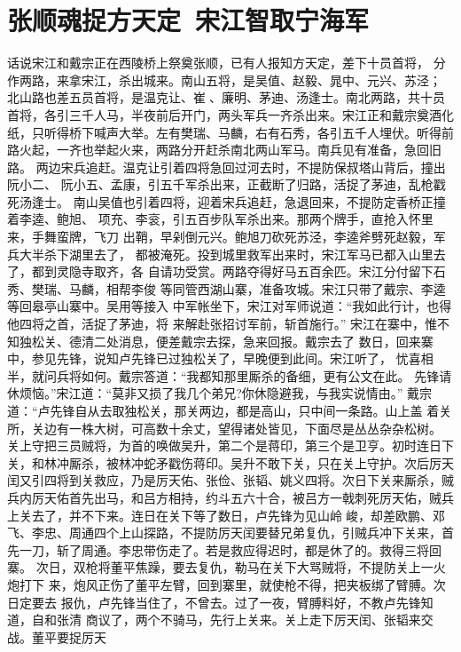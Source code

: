\chapter{张顺魂捉方天定~宋江智取宁海军}

话说宋江和戴宗正在西陵桥上祭奠张顺，已有人报知方天定，差下十员首将，
分作两路，来拿宋江，杀出城来。南山五将，是吴值、赵毅、晁中、元兴、苏泾；
北山路也差五员首将，是温克让、崔、廉明、茅迪、汤逢士。南北两路，共十员
首将，各引三千人马，半夜前后开门，两头军兵一齐杀出来。宋江正和戴宗奠酒化
纸，只听得桥下喊声大举。左有樊瑞、马麟，右有石秀，各引五千人埋伏。听得前
路火起，一齐也举起火来，两路分开赶杀南北两山军马。南兵见有准备，急回旧路。
两边宋兵追赶。温克让引着四将急回过河去时，不提防保叔塔山背后，撞出阮小二、
阮小五、孟康，引五千军杀出来，正截断了归路，活捉了茅迪，乱枪戳死汤逢士。
南山吴值也引着四将，迎着宋兵追赶，急退回来，不提防定香桥正撞着李逵、鲍旭、
项充、李衮，引五百步队军杀出来。那两个牌手，直抢入怀里来，手舞蛮牌，飞刀
出鞘，早剁倒元兴。鲍旭刀砍死苏泾，李逵斧劈死赵毅，军兵大半杀下湖里去了，
都被淹死。投到城里救军出来时，宋江军马已都入山里去了，都到灵隐寺取齐，各
自请功受赏。两路夺得好马五百余匹。宋江分付留下石秀、樊瑞、马麟，相帮李俊
等同管西湖山寨，准备攻城。宋江只带了戴宗、李逵等回皋亭山寨中。吴用等接入
中军帐坐下，宋江对军师说道：“我如此行计，也得他四将之首，活捉了茅迪，将
来解赴张招讨军前，斩首施行。”
宋江在寨中，惟不知独松关、德清二处消息，便差戴宗去探，急来回报。戴宗去了
数日，回来寨中，参见先锋，说知卢先锋已过独松关了，早晚便到此间。宋江听了，
忧喜相半，就问兵将如何。戴宗答道：“我都知那里厮杀的备细，更有公文在此。
先锋请休烦恼。”宋江道：“莫非又损了我几个弟兄?你休隐避我，与我实说情由。”
戴宗道：“卢先锋自从去取独松关，那关两边，都是高山，只中间一条路。山上盖
着关所，关边有一株大树，可高数十余丈，望得诸处皆见，下面尽是丛丛杂杂松树。
关上守把三员贼将，为首的唤做吴升，第二个是蒋印，第三个是卫亨。初时连日下
关，和林冲厮杀，被林冲蛇矛戳伤蒋印。吴升不敢下关，只在关上守护。次后厉天
闰又引四将到关救应，乃是厉天佑、张俭、张韬、姚义四将。次日下关来厮杀，贼
兵内厉天佑首先出马，和吕方相持，约斗五六十合，被吕方一戟刺死厉天佑，贼兵
上关去了，并不下来。连日在关下等了数日，卢先锋为见山岭峻，却差欧鹏、邓
飞、李忠、周通四个上山探路，不提防厉天闰要替兄弟复仇，引贼兵冲下关来，首
先一刀，斩了周通。李忠带伤走了。若是救应得迟时，都是休了的。救得三将回寨。
次日，双枪将董平焦躁，要去复仇，勒马在关下大骂贼将，不提防关上一火炮打下
来，炮风正伤了董平左臂，回到寨里，就使枪不得，把夹板绑了臂膊。次日定要去
报仇，卢先锋当住了，不曾去。过了一夜，臂膊料好，不教卢先锋知道，自和张清
商议了，两个不骑马，先行上关来。关上走下厉天闰、张韬来交战。董平要捉厉天
